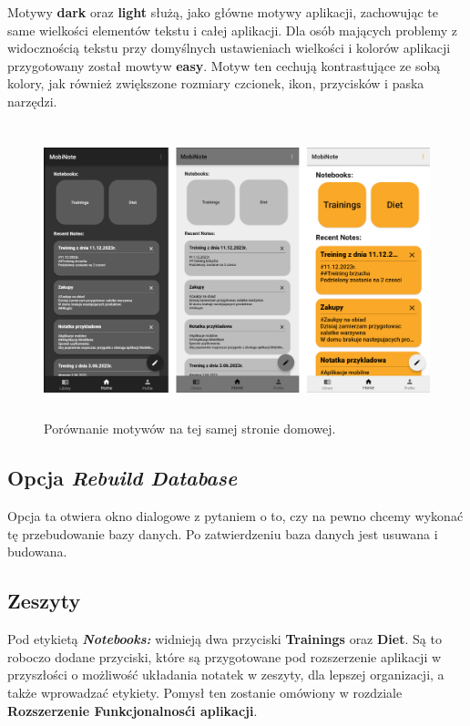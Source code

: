 \documentclass[shortabstract]{iithesis}
\begin{document}
Motywy \textbf{dark} oraz \textbf{light} służą, jako główne motywy aplikacji, zachowując te same wielkości elementów tekstu i całej aplikacji.
Dla osób mających problemy z widocznością tekstu przy domyślnych ustawieniach wielkości i kolorów aplikacji przygotowany został mowtyw \textbf{easy}.
Motyw ten cechują kontrastujące ze sobą kolory, jak również zwiększone rozmiary czcionek, ikon, przycisków i paska narzędzi.

\begin{figure}[h]
    \centering
    \includegraphics[height=8.5cm]{images/strona_domowa_motywy.png}
    \caption{Porównanie motywów na tej samej stronie domowej.}
\end{figure}

\subsection{Opcja \textit{Rebuild Database}}

Opcja ta otwiera okno dialogowe z pytaniem o to, czy na pewno chcemy wykonać tę przebudowanie bazy danych. Po zatwierdzeniu baza danych jest usuwana i budowana.

\subsection{Zeszyty}

Pod etykietą \textbf{\textit{Notebooks:}} widnieją dwa przyciski \textbf{Trainings} oraz \textbf{Diet}. Są to roboczo dodane przyciski, które są przygotowane pod rozszerzenie aplikacji w przyszłości o możliwość układania notatek w zeszyty, dla lepszej organizacji, a także wprowadzać etykiety.
Pomysł ten zostanie omówiony w rozdziale \textbf{Rozszerzenie Funkcjonalnosći aplikacji}.
\end{document}
